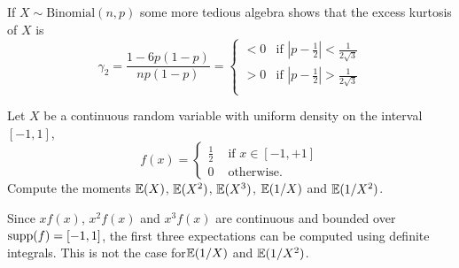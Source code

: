 \begin{example}\label{ex:kurtosis_binomial}
If $X\sim\text{Binomial}(n,p)$ some more tedious algebra shows that the excess kurtosis of $X$ is
\[
\gamma_2 = \frac{1-6p(1-p)}{np(1-p)} = \begin{cases}
	< 0 				& \text{if } \left|p -\frac{1}{2}\right| < \frac{1}{2\sqrt{3}} \\
	> 0 				& \text{if } \left|p -\frac{1}{2}\right| > \frac{1}{2\sqrt{3}} \\
\end{cases}
\]
\end{example}

\begin{exercise}
\begin{questions}

\question
Let $X$ be a continuous random variable with uniform density on the interval $[-1,1]$,
\[
f(x) = \begin{cases}
	\frac{1}{2}	& \text{ if } x\in[-1,+1] \\
	0			& \text{ otherwise.}
\end{cases}
\]
Compute the moments $\mathbb{E}(X)$, $\mathbb{E}(X^2)$, $\mathbb{E}(X^3)$, $\mathbb{E}(1/X)$ and $\mathbb{E}(1/X^2)$.
\begin{answer}
Since $xf(x)$, $x^2f(x)$ and $x^3f(x)$ are continuous and bounded over $\text{supp}(f)=[-1,1]$, the first three expectations can be computed using definite integrals. This is not the case for$\mathbb{E}(1/X)$ and $\mathbb{E}(1/X^2)$.


\end{answer}
\end{questions}
\end{exercise}

